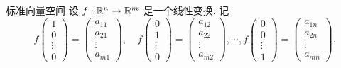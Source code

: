 \begin{frame}{标准向量空间}
	\onslide<+->
	设 $f:{\mathbb{R}}^n\to{\mathbb{R}}^m$ 是一个线性变换,
	\onslide<+->
	记
	\[f\begin{pmatrix}
		1\\0\\\vdots\\0
	\end{pmatrix}=\begin{pmatrix}
		a_{11}\\a_{21}\\\vdots\\a_{m1}
	\end{pmatrix},\quad
	f\begin{pmatrix}
		0\\1\\\vdots\\0
	\end{pmatrix}=\begin{pmatrix}
		a_{12}\\a_{22}\\\vdots\\a_{m2}
	\end{pmatrix},\cdots,
	f\begin{pmatrix}
		0\\0\\\vdots\\1
	\end{pmatrix}=\begin{pmatrix}
		a_{1n}\\a_{2n}\\\vdots\\a_{mn}
	\end{pmatrix}.\]
\end{frame}


